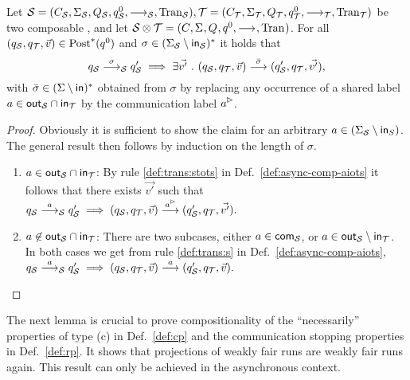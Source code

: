 \begin{lemma}\label{lem:reuse-sequence}
    Let $\S = \aiotstup{\S},\T = \aiotstup{\T}$ be two composable \AIOTSs, and let $\S\compos\T = \aiotstup{}$. For all $(q_\S,q_\T,\vec{v}) \in \post^*(q^0)$ and $\sigma \in (\Sigma_\S \setminus \inset_\S)^*$ it holds that
    \[
        q_\S \goes{\sigma}_\S q'_\S \implies \exists \vec{v'}\ .\ (q_\S,q_\T,\vec{v}) \goes{\bar\sigma} (q'_\S,q_\T,\vec{v'}),
    \]
    with $\bar\sigma \in (\Sigma \setminus \inset)^*$ obtained from $\sigma$ by replacing any occurrence of a shared label $a \in \outset_\S \cap \inset_\T$ by the communication label $\outact{a}$.
\end{lemma}
\begin{proof}
	Obviously it is sufficient to show the claim for an arbitrary $a \in (\Sigma_\S \setminus \inset_S)$. The general result then follows by induction on the length of $\sigma$.
    \begin{enumerate}
        \item$a \in \outset_\S \cap \inset_\T$: By rule \ref{def:trans:stots} in Def.~\ref{def:async-comp-aiots} it follows that there exists $\vec{v'}$ such that
                    $q_\S \goes{a}_\S q'_\S \implies (q_\S,q_\T,\vec{v}) \goes{\outact{a}} (q'_\S,q_\T,\vec{v'}).$
        \item$a \not\in \outset_\S \cap \inset_\T$: There are two subcases, either $a \in \com_\S$, or $a \in \outset_\S \setminus \inset_\T$. In both cases we get from rule \ref{def:trans:s} in Def.~\ref{def:async-comp-aiots}, \\
            $q_\S \goes{a}_\S q'_\S \implies (q_\S,q_\T,\vec{v}) \goes{a} (q'_\S,q_\T,\vec{v}) .$  
    \end{enumerate} 
\end{proof}

The next lemma is crucial to prove compositionality of the
``necessarily'' properties of type (c) in Def.~\ref{def:cp} and the communication stopping properties in Def.~\ref{def:rp}.
It shows that projections of weakly fair runs are weakly fair runs again.
This result can only be achieved in the asynchronous context.

